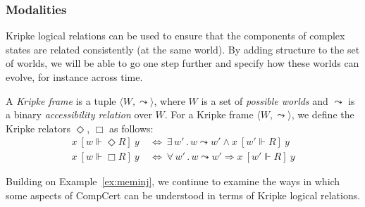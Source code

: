 \documentclass[acmsmall,timestamp,review,anonymous]{acmart}
\newcommand{\ifr}[1]{\ [{#1}]\ }
\begin{document}
\subsubsection{Modalities}

Kripke logical relations
can be used to ensure that the components of complex states
are related consistently (at the same world).
By adding structure to the set of worlds,
we will be able to go one step further and
specify how these worlds can evolve,
for instance across time.

\begin{definition} %
A \emph{Kripke frame} is a tuple
$\langle W, {\leadsto} \rangle$, where
$W$ is a set of \emph{possible worlds} and
$\leadsto$ is a
binary \emph{accessibility relation} over $W$.
For a Kripke frame
$\langle W, \leadsto \rangle$,
we define the Kripke relators $\Diamond$, $\Box$ as follows:
\begin{align*}
  x \ifr{w \Vdash \Diamond R} y & \: \Leftrightarrow \:
    \exists \, w' \,.\, w \leadsto w' \wedge
      x \ifr{w' \Vdash R} y \\
  x \ifr{w \Vdash \Box R} y & \: \Leftrightarrow \:
    \forall \, w' \,.\, w \leadsto w' \Rightarrow
      x \ifr{w' \Vdash R} y
\end{align*}
\end{definition}

Building on Example~\ref{ex:meminj},
we continue to examine the ways in which
some aspects of CompCert can be understood
in terms of Kripke logical relations.
\end{document}
